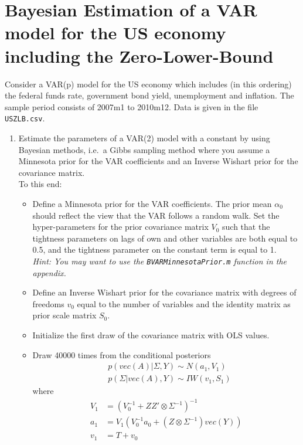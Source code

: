 \section[Bayesian Estimation of a VAR model for the US economy including the Zero-Lower-Bound]{Bayesian Estimation of a VAR model for the US economy including the Zero-Lower-Bound\label{ex:BayesianEstimationVARZLB}}
Consider a VAR(p) model for the US economy which includes (in this ordering)
  the federal funds rate, government bond yield, unemployment and inflation.
The sample period consists of 2007m1 to 2010m12.
Data is given in the file \texttt{USZLB.csv}.
\begin{enumerate}
\item Estimate the parameters of a VAR(2) model with a constant by using Bayesian methods,
  i.e.\ a Gibbs sampling method where you assume a Minnesota prior for the VAR coefficients
  and an Inverse Wishart prior for the covariance matrix.
\\
To this end:
\begin{itemize}
\item Define a Minnesota prior for the VAR coefficients.
The prior mean \(\alpha_0\) should reflect the view that the VAR follows a random walk.
Set the hyper-parameters for the prior covariance matrix \(V_0\) such that
  the tightness parameters on lags of own and other variables are both equal to 0.5, 
  and the tightness parameter on the constant term is equal to 1.
  \\
  \emph{Hint: You may want to use the \texttt{BVARMinnesotaPrior.m} function in the appendix.}
\item Define an Inverse Wishart prior for the covariance matrix
with degrees of freedoms \(v_0\) equal to the number of variables
and the identity matrix as prior scale matrix \(S_0\).
\item Initialize the first draw of the covariance matrix with OLS values.
\item Draw 40000 times from the conditional posteriors
\begin{align*}
&p(vec(A)|\Sigma,Y) \sim N(a_1,V_1)
\\
&p(\Sigma|vec(A),Y) \sim IW(v_1, S_1)
\end{align*}
where
\begin{align*}
V_1 &= {\left(V_0^{-1}+ZZ' \otimes \Sigma^{-1}\right)}^{-1}
\\
a_1 &= V_1 \left(V_0^{-1}a_0 + (Z \otimes \Sigma^{-1})vec(Y)\right)
\\
v_1 &= T + v_0
\\

\end{align*}
\end{itemize}
\end{enumerate}
